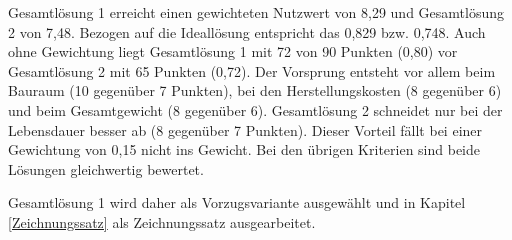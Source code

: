 \documentclass[../main.tex]{subfiles}
\begin{document}
Gesamtlösung 1 erreicht einen gewichteten Nutzwert von 8,29 und Gesamtlösung 2 von 7,48. Bezogen auf die Ideallösung entspricht das 0,829 bzw. 0,748. Auch ohne Gewichtung liegt Gesamtlösung 1 mit 72 von 90 Punkten (0,80) vor Gesamtlösung 2 mit 65 Punkten (0,72). Der Vorsprung entsteht vor allem beim Bauraum (10 gegenüber 7 Punkten), bei den Herstellungskosten (8 gegenüber 6) und beim Gesamtgewicht (8 gegenüber 6). Gesamtlösung 2 schneidet nur bei der Lebensdauer besser ab (8 gegenüber 7 Punkten). Dieser Vorteil fällt bei einer Gewichtung von 0,15 nicht ins Gewicht. Bei den übrigen Kriterien sind beide Lösungen gleichwertig bewertet.

Gesamtlösung 1 wird daher als Vorzugsvariante ausgewählt und in Kapitel \ref{Zeichnungssatz} als Zeichnungssatz ausgearbeitet.
\end{document}
